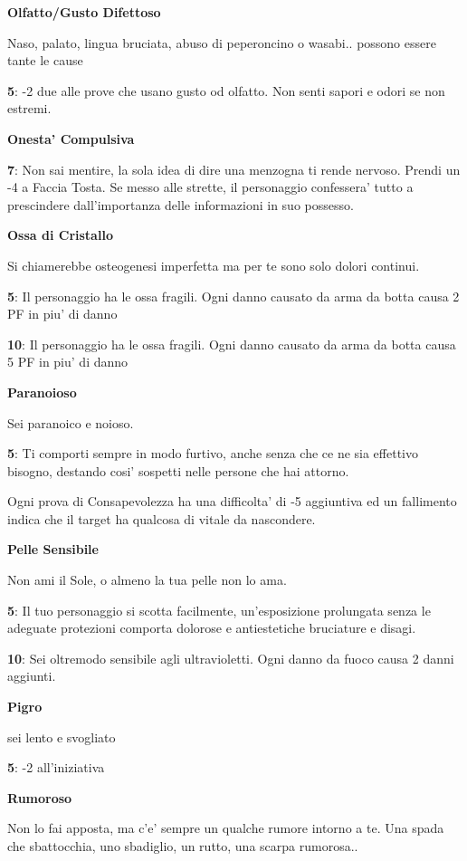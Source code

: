 \documentclass[a4paper,11pt,twoside,openany]{book}
\begin{document}
{\textbf{Olfatto/Gusto Difettoso}

Naso, palato, lingua bruciata, abuso di peperoncino o wasabi.. possono essere tante le cause

\textbf{5}: -2 due alle prove che usano gusto od olfatto. Non senti sapori e odori se non estremi.

\textbf{Onesta' Compulsiva}

\textbf{7}: Non sai mentire, la sola idea di dire una menzogna ti rende nervoso. Prendi un -4 a Faccia Tosta. Se messo alle strette, il personaggio confessera' tutto a prescindere dall'importanza delle informazioni in suo possesso.

\textbf{Ossa di Cristallo}

Si chiamerebbe osteogenesi imperfetta ma per te sono solo dolori continui.

\textbf{5}: Il personaggio ha le ossa fragili. Ogni danno causato da arma da botta causa 2 PF in piu' di danno

\textbf{10}: Il personaggio ha le ossa fragili. Ogni danno causato da arma da botta causa 5 PF in piu' di danno

\textbf{Paranoioso}

Sei paranoico e noioso.

\textbf{5}: Ti comporti sempre in modo furtivo, anche senza che ce ne sia effettivo bisogno, destando cosi' sospetti nelle persone che hai attorno.

Ogni prova di Consapevolezza ha una difficolta' di -5 aggiuntiva ed un fallimento indica che il target ha qualcosa di vitale da nascondere.

\textbf{Pelle Sensibile}

Non ami il Sole, o almeno la tua pelle non lo ama.

\textbf{5}: Il tuo personaggio si scotta facilmente, un'esposizione prolungata senza le adeguate protezioni comporta dolorose e antiestetiche bruciature e disagi.

\textbf{10}: Sei oltremodo sensibile agli ultravioletti. Ogni danno da fuoco causa 2 danni aggiunti.

\textbf{Pigro}

sei lento e svogliato

\textbf{5}: -2 all'iniziativa

\textbf{Rumoroso}

Non lo fai apposta, ma c'e' sempre un qualche rumore intorno a te. Una spada che sbattocchia, uno sbadiglio, un rutto, una scarpa rumorosa..

}
\end{document}
